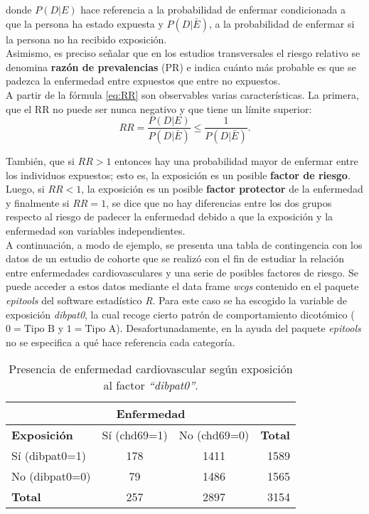 donde $P(D|E)$ hace referencia a la probabilidad de enfermar condicionada a que la persona ha estado expuesta y $P(D|\bar{E})$,  a la probabilidad de enfermar si la persona no ha recibido exposición. \\

Asimismo, es preciso señalar que en los estudios transversales el riesgo relativo se denomina \textbf{razón de prevalencias} (PR) e indica cuánto más probable es que se padezca la enfermedad entre expuestos que entre no expuestos.\\

A partir de la fórmula \eqref{eq:RR} son observables varias características. La primera, que el RR no puede ser nunca negativo y que tiene un límite superior:
\begin{equation*}
RR=\frac{P(D|E)}{P(D|\bar{E})} \le \frac{1}{P(D|\bar{E})}.
\end{equation*}

También, que si $RR>1$ entonces hay una probabilidad mayor de enfermar entre los individuos expuestos; esto es, la exposición es un posible \textbf{factor de riesgo}. Luego, si $RR<1$, la exposición es un posible \textbf{factor protector} de la enfermedad y finalmente si $RR=1$, se dice que no hay diferencias entre los dos grupos respecto al riesgo de padecer la enfermedad debido a que la exposición y la enfermedad son variables independientes.  \\

A continuación, a modo de ejemplo, se presenta una tabla de contingencia con los datos de un estudio de cohorte que se realizó con el fin de estudiar la relación entre enfermedades cardiovasculares y una serie de posibles factores de riesgo.   Se puede acceder a estos datos mediante el data frame \textit{wcgs} contenido en el paquete \textit{epitools} \autocite{Epitools} del software estadístico \textit{R}. Para este caso se ha escogido la variable de exposición \textit{dibpat0}, la cual recoge cierto patrón de comportamiento dicotómico ($0 = \text{Tipo B}$ y $1 = \text{Tipo A}$). Desafortunadamente, en la ayuda del paquete \textit{epitools} no se especifica a qué hace referencia cada categoría.  \\

\begin{table} [h!]
	\centering
	\label{tab:1}
	\begin{tabular}{l c c r}
		\toprule
		\multicolumn{4}{c}{\textbf{Enfermedad}} \\
		\midrule
		\textbf{Exposición} & Sí (chd69=1) & No (chd69=0) & 	\textbf{Total} \\
		\midrule
		Sí (dibpat0=1)  & 178   & 1411 &   1589\\
		No (dibpat0=0) &   79  & 1486   &1565\\
		\textbf{Total} & 257  & 2897 & 3154\\
		\bottomrule
	\end{tabular}
	\caption{Presencia de enfermedad cardiovascular según exposición al factor \textit{``dibpat0''}. }
\end{table}

